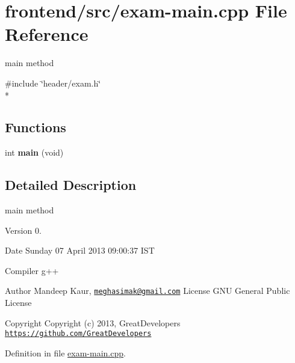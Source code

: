 \hypertarget{exam-main_8cpp}{\section{frontend/src/exam-\/main.cpp File Reference}
\label{exam-main_8cpp}
}


main method  


{\ttfamily \#include \char`\"{}header/exam.\-h\char`\"{}}\\*
\subsection*{Functions}
\begin{DoxyCompactItemize}
\item 
\hypertarget{exam-main_8cpp_a840291bc02cba5474a4cb46a9b9566fe}{int {\bfseries main} (void)}\label{exam-main_8cpp_a840291bc02cba5474a4cb46a9b9566fe}

\end{DoxyCompactItemize}


\subsection{Detailed Description}
main method \begin{DoxyVersion}{Version}
0. 
\end{DoxyVersion}
\begin{DoxyDate}{Date}
Sunday 07 April 2013 09\-:00\-:37 I\-S\-T\par
Compiler g++
\end{DoxyDate}
\begin{DoxyAuthor}{Author}
Mandeep Kaur, \href{mailto:meghasimak@gmail.com}{\tt meghasimak@gmail.\-com} License G\-N\-U General Public License 
\end{DoxyAuthor}
\begin{DoxyCopyright}{Copyright}
Copyright (c) 2013, Great\-Developers \href{https://github.com/GreatDevelopers}{\tt https\-://github.\-com/\-Great\-Developers} 
\end{DoxyCopyright}


Definition in file \hyperlink{exam-main_8cpp_source}{exam-\/main.\-cpp}.

